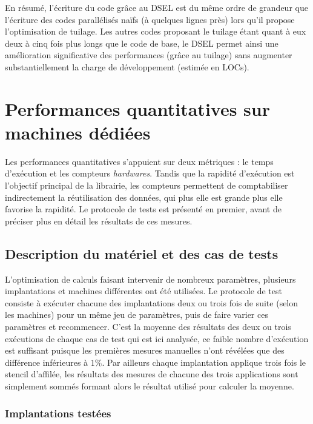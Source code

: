 En résumé, l'écriture du code grâce au DSEL est du même ordre de grandeur que l'écriture des codes parallélisés naïfs (à quelques lignes près) lors qu'il propose l'optimisation de tuilage. Les autres codes proposant le tuilage étant quant à eux deux à cinq fois plus longs que le code de base, le DSEL permet ainsi une amélioration significative des performances (grâce au tuilage) sans augmenter substantiellement la charge de développement (estimée en LOCs).


\section{Performances quantitatives sur machines dédiées}

Les performances quantitatives s'appuient sur deux métriques : le temps d'exécution et les compteurs \emph{hardwares}. Tandis que la rapidité d'exécution est l'objectif principal de la librairie, les compteurs permettent de comptabiliser indirectement la réutilisation des données, qui plus elle est grande plus elle favorise la rapidité. Le protocole de tests est présenté en premier, avant de préciser plus en détail les résultats de ces mesures.

\subsection{Description du matériel et des cas de tests}
\label{sec:desc_mat_tests}

L'optimisation de calculs faisant intervenir de nombreux paramètres, plusieurs implantations et machines différentes ont été utilisées. Le protocole de test consiste à exécuter chacune des implantations deux ou trois fois de suite (selon les machines) pour un même jeu de paramètres, puis de faire varier ces paramètres et recommencer. C'est la moyenne des résultats des deux ou trois exécutions de chaque cas de test qui est ici analysée, ce faible nombre d'exécution est suffisant puisque les premières mesures manuelles n'ont révélées que des différence inférieures à $1\%$. Par ailleurs chaque implantation applique trois fois le stencil d'affilée, les résultats des mesures de chacune des trois applications sont simplement sommés formant alors le résultat utilisé pour calculer la moyenne.

\subsubsection*{Implantations testées}

